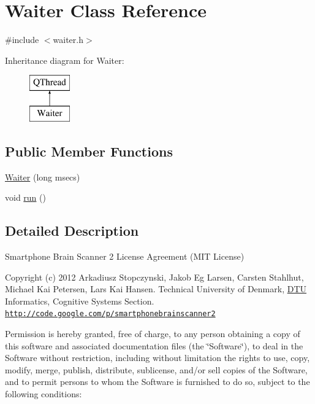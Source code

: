 \hypertarget{classWaiter}{\section{Waiter Class Reference}
\label{classWaiter}
}


{\ttfamily \#include $<$waiter.\-h$>$}

Inheritance diagram for Waiter\-:\begin{figure}[H]
\begin{center}
\leavevmode
\includegraphics[height=2.000000cm]{classWaiter}
\end{center}
\end{figure}
\subsection*{Public Member Functions}
\begin{DoxyCompactItemize}
\item 
\hyperlink{classWaiter_a8c26bfa810034fca946ad2517442950a}{Waiter} (long msecs)
\item 
void \hyperlink{classWaiter_a313daa52281a1dca00f211e6df2f2676}{run} ()
\end{DoxyCompactItemize}


\subsection{Detailed Description}
Smartphone Brain Scanner 2 License Agreement (M\-I\-T License)

Copyright (c) 2012 Arkadiusz Stopczynski, Jakob Eg Larsen, Carsten Stahlhut, Michael Kai Petersen, Lars Kai Hansen. Technical University of Denmark, \hyperlink{namespaceDTU}{D\-T\-U} Informatics, Cognitive Systems Section. \href{http://code.google.com/p/smartphonebrainscanner2}{\tt http\-://code.\-google.\-com/p/smartphonebrainscanner2}

Permission is hereby granted, free of charge, to any person obtaining a copy of this software and associated documentation files (the \char`\"{}\-Software\char`\"{}), to deal in the Software without restriction, including without limitation the rights to use, copy, modify, merge, publish, distribute, sublicense, and/or sell copies of the Software, and to permit persons to whom the Software is furnished to do so, subject to the following conditions\-:

